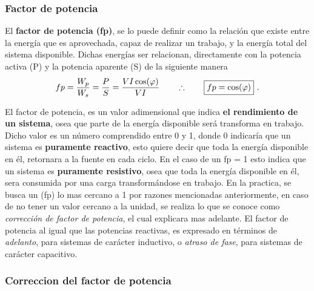          \subsubsection{Factor de potencia}
         
               El \textbf{factor de potencia (fp)}, se lo puede definir como la relación que
               existe entre la energía que es aprovechada, capaz de realizar un trabajo, y la 
               energía total del sistema disponible.
               Dichas energías ser relacionan, directamente con la potencia activa (P) y 
               la potencia aparente (S) de la siguiente manera
               \begin{equation}
               fp = \frac{W_p}{W_s} = \frac{P}{S} = \dfrac{V I \cos(\varphi)}{V I} \notag \\
                        \hspace{20pt} \therefore \hspace{20pt} \boxed{fp = \cos(\varphi)}~.\label{eqn:fpFinal} 
               \end{equation}

               El factor de potencia, es un valor adimensional que indica 
               \textbf{el rendimiento de un sistema}, osea que parte de la energía disponible 
               será transforma en trabajo. Dicho valor es un número comprendido entre 0 y 1, 
               donde 0 indicaría que un sistema es \textbf{puramente reactivo}, esto quiere 
               decir que toda la energía disponible en él, retornara a la fuente en cada ciclo. 
               En el caso de un fp = 1 esto indica que un sistema es \textbf{puramente resistivo}, 
               osea que toda la energía disponible en él, sera consumida por una carga
               transformándose en trabajo. En la practica, se busca un (fp) lo mas
               cercano a 1 por razones mencionadas anteriormente, en caso de no tener un valor
               cercano a la unidad, se realiza lo que se conoce como \textit{corrección de
               factor de potencia}, el cual explicara mas adelante. 
               El factor de potencia al igual que las potencias reactivas, es expresado en 
               términos de \textit{adelanto}, para sistemas de carácter inductivo, o 
               \textit{atraso de fase}, para sistemas de carácter capacitivo.

            \subsubsection{Correccion del factor de potencia}
               
